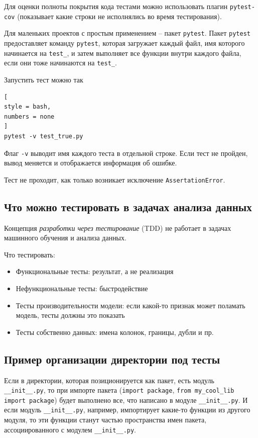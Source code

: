 \documentclass[%
	11pt,
	a4paper,
	utf8,
		]{article}
\begin{document}
Для оценки полноты покрытия кода тестами можно использовать плагин \texttt{pytest-cov} (показывает какие строки не исполнялись во время тестирования).

Для маленьких проектов с простым применением -- пакет \texttt{pytest}. Пакет \texttt{pytest} предоставляет команду \texttt{pytest}, которая загружает каждый файл, имя которого начинается на \texttt{test\_}, и затем выполняет все функции внутри каждого файла, если они тоже начинаются на \texttt{test\_}.

Запустить тест можно так
\begin{lstlisting}[
style = bash,
numbers = none	
]
pytest -v test_true.py
\end{lstlisting}

Флаг \verb|-v| выводит имя каждого теста в отдельной строке. Если тест не пройден, вывод меняется и отображается информация об ошибке.

Тест не проходит, как только возникает исключение \texttt{AssertationError}.

\subsection{Что можно тестировать в задачах анализа данных}

{\color{red} Концепция \emph{разработки через тестирование} (TDD) не работает в задачах машинного обучения и анализа данных.}

Что тестировать:
\begin{itemize}
	\item Функциональные тесты: результат, а не реализация
	
	\item Нефункциональные тесты: быстродействие
	
	\item Тесты производительности модели: если какой-то признак может поламать модель, тесты должны это показать
	
	\item Тесты собственно данных: имена колонок, границы, дубли и пр.
\end{itemize}

\subsection{Пример организации директории под тесты}

Если в директории, которая позиционируется как пакет, есть модуль \texttt{\_\_init\_\_.py}, то при импорте пакета (\texttt{import package}, \texttt{from my\_cool\_lib import package}) будет выполнено все, что написано в модуле  \texttt{\_\_init\_\_.py}. И если модуль \texttt{\_\_init\_\_.py}, например, импортирует какие-то функции из другого модуля, то эти функции станут частью пространства имен пакета, ассоциированного с модулем \texttt{\_\_init\_\_.py}.
\end{document}
